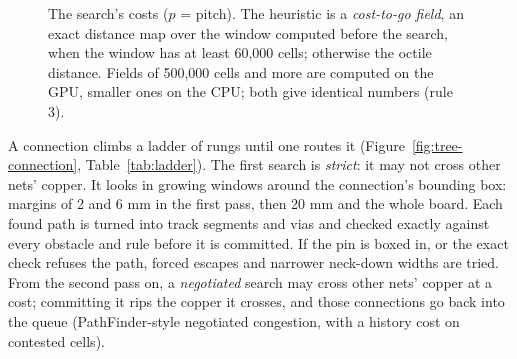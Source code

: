 \documentclass[10pt,a4paper]{article}
\newcommand{\opt}[1]{\texttt{\detokenize{#1}}}
\begin{document}
\begin{figure}[H]
\centering
{}
\caption{The search's costs ($p$ = pitch). The heuristic is a \emph{cost-to-go field}, an exact distance map over the window computed
before the search, when the window has at least 60,000 cells; otherwise the octile distance. Fields of 500,000 cells and more are
computed on the GPU, smaller ones on the CPU; both give identical numbers (rule 3).}
\label{fig:costs}
\end{figure}

A connection climbs a ladder of rungs until one routes it (Figure~\ref{fig:tree-connection}, Table~\ref{tab:ladder}). The first search
is \emph{strict}: it may not cross other nets' copper. It looks in growing windows around the connection's bounding box: margins of 2
and 6 mm in the first pass, then 20 mm and the whole board. Each found path is turned into track segments and vias and checked
exactly against every obstacle and rule before it is committed. If the pin is boxed in, or the exact check refuses the path, forced
escapes and narrower neck-down widths are tried. From the second pass on, a \emph{negotiated} search may cross other nets' copper at a
cost; committing it rips the copper it crosses, and those connections go back into the queue (PathFinder-style negotiated congestion,
with a history cost on contested cells).
\end{document}
